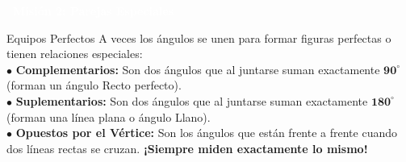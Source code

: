 \documentclass[12pt, letterpaper]{article}
\newcommand{\mision}[1]{
	\vspace{0.6cm}
	\begin{tcolorbox}[
		enhanced, colback=valdark, colframe=valdark, arc=2mm, boxrule=0pt,
		halign=center, valign=center, top=3mm, bottom=3mm, left=2mm, right=2mm,
		drop shadow=valdark!50
		]
		\textcolor{white}{\Large \textbf{\ding{118}\ #1}}
	\end{tcolorbox}
	\vspace{0.3cm}
}
\begin{document}
	\newpage
	
	\mision{Misión 2: Parejas Especiales}
	
	\begin{conceptbox}{Equipos Perfectos}
		A veces los ángulos se unen para formar figuras perfectas o tienen relaciones especiales:\\
		$\bullet$ \textbf{Complementarios:} Son dos ángulos que al juntarse suman exactamente \textbf{$\mathbf{90^\circ}$} (forman un ángulo Recto perfecto).\\
		$\bullet$ \textbf{Suplementarios:} Son dos ángulos que al juntarse suman exactamente \textbf{$\mathbf{180^\circ}$} (forman una línea plana o ángulo Llano).\\
		$\bullet$ \textbf{Opuestos por el Vértice:} Son los ángulos que están frente a frente cuando dos líneas rectas se cruzan. \textbf{¡Siempre miden exactamente lo mismo!}
	\end{conceptbox}
	
\end{document}
